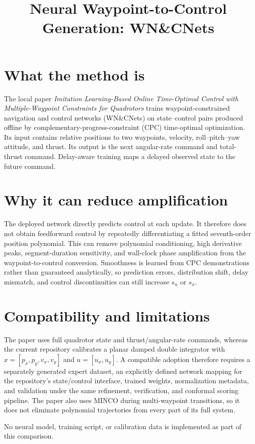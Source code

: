 \documentclass[11pt]{article}
\title{Neural Waypoint-to-Control Generation: WN\&CNets}\author{}\date{}
\begin{document}
\maketitle
\section*{What the method is}
The local paper \emph{Imitation Learning-Based Online Time-Optimal Control with Multiple-Waypoint Constraints for Quadrotors} trains waypoint-constrained navigation and control networks (WN\&CNets) on state--control pairs produced offline by complementary-progress-constraint (CPC) time-optimal optimization. Its input contains relative positions to two waypoints, velocity, roll--pitch--yaw attitude, and thrust. Its output is the next angular-rate command and total-thrust command. Delay-aware training maps a delayed observed state to the future command.
\section*{Why it can reduce amplification}
The deployed network directly predicts control at each update. It therefore does not obtain feedforward control by repeatedly differentiating a fitted seventh-order position polynomial. This can remove polynomial conditioning, high derivative peaks, segment-duration sensitivity, and wall-clock phase amplification from the waypoint-to-control conversion. Smoothness is learned from CPC demonstrations rather than guaranteed analytically, so prediction errors, distribution shift, delay mismatch, and control discontinuities can still increase $s_u$ or $s_x$.
\section*{Compatibility and limitations}
The paper uses full quadrotor state and thrust/angular-rate commands, whereas the current repository calibrates a planar damped double integrator with $x=[p_x,p_y,v_x,v_y]$ and $u=[u_x,u_y]$. A compatible adoption therefore requires a separately generated expert dataset, an explicitly defined network mapping for the repository's state/control interface, trained weights, normalization metadata, and validation under the same refinement, verification, and conformal scoring pipeline. The paper also uses MINCO during multi-waypoint transitions, so it does not eliminate polynomial trajectories from every part of its full system.

No neural model, training script, or calibration data is implemented as part of this comparison.
\end{document}
